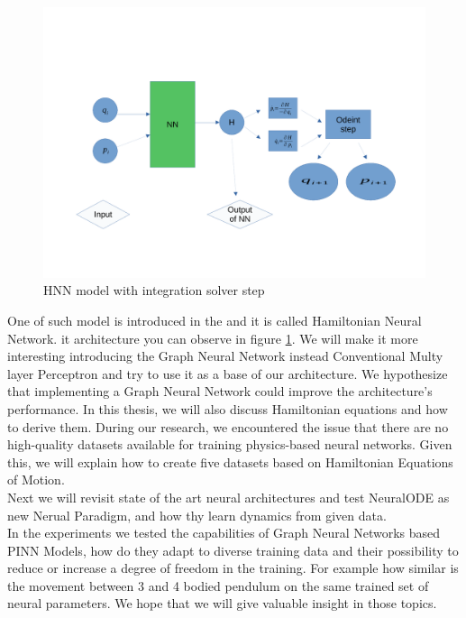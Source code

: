 \begin{figure}[h!]
	\includegraphics[width=15cm]{chapters/chapter1/hnn}
	\caption{HNN model with integration solver step}
	\label{fig:hnn}
\end{figure}
One of such model is introduced in the \cite{hnn} and it is called Hamiltonian Neural Network. it architecture you can observe in figure \ref{fig:hnn}.
We will make it more interesting introducing the Graph Neural Network instead Conventional Multy layer Perceptron and try to use it as a base of our architecture. We hypothesize that implementing a Graph Neural Network could improve the architecture's performance. 
In this thesis, we will also discuss Hamiltonian equations and how to derive them. During our research, we encountered the issue that there are no high-quality datasets available for training physics-based neural networks. Given this, we will explain how to create five datasets based on Hamiltonian Equations of Motion.\\
Next we will revisit state of the art neural architectures and test NeuralODE as new Nerual Paradigm, and how thy learn dynamics from given data.\\
In the experiments we tested the capabilities of Graph Neural Networks based PINN Models, how do they adapt to diverse training data and their possibility to reduce or increase a degree of freedom in the training. For example how similar is the movement between 3 and 4 bodied pendulum on the same trained set of neural parameters. We hope that we will give valuable insight in those topics.    








